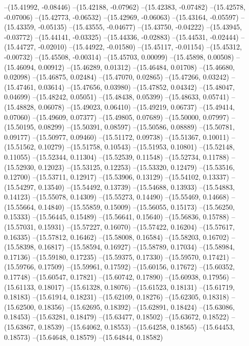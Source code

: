 --(15.41992, -0.08446)
--(15.42188, -0.07962)
--(15.42383, -0.07482)
--(15.42578, -0.07006)
--(15.42773, -0.06532)
--(15.42969, -0.06063)
--(15.43164, -0.05597)
--(15.43359, -0.05135)
--(15.43555, -0.04677)
--(15.43750, -0.04222)
--(15.43945, -0.03772)
--(15.44141, -0.03325)
--(15.44336, -0.02883)
--(15.44531, -0.02444)
--(15.44727, -0.02010)
--(15.44922, -0.01580)
--(15.45117, -0.01154)
--(15.45312, -0.00732)
--(15.45508, -0.00314)
--(15.45703, 0.00099)
--(15.45898, 0.00508)
--(15.46094, 0.00912)
--(15.46289, 0.01312)
--(15.46484, 0.01708)
--(15.46680, 0.02098)
--(15.46875, 0.02484)
--(15.47070, 0.02865)
--(15.47266, 0.03242)
--(15.47461, 0.03614)
--(15.47656, 0.03980)
--(15.47852, 0.04342)
--(15.48047, 0.04699)
--(15.48242, 0.05051)
--(15.48438, 0.05399)
--(15.48633, 0.05741)
--(15.48828, 0.06078)
--(15.49023, 0.06410)
--(15.49219, 0.06737)
--(15.49414, 0.07060)
--(15.49609, 0.07377)
--(15.49805, 0.07689)
--(15.50000, 0.07997)
--(15.50195, 0.08299)
--(15.50391, 0.08597)
--(15.50586, 0.08889)
--(15.50781, 0.09177)
--(15.50977, 0.09460)
--(15.51172, 0.09738)
--(15.51367, 0.10011)
--(15.51562, 0.10279)
--(15.51758, 0.10543)
--(15.51953, 0.10801)
--(15.52148, 0.11055)
--(15.52344, 0.11304)
--(15.52539, 0.11548)
--(15.52734, 0.11788)
--(15.52930, 0.12023)
--(15.53125, 0.12253)
--(15.53320, 0.12479)
--(15.53516, 0.12700)
--(15.53711, 0.12917)
--(15.53906, 0.13129)
--(15.54102, 0.13337)
--(15.54297, 0.13540)
--(15.54492, 0.13739)
--(15.54688, 0.13933)
--(15.54883, 0.14123)
--(15.55078, 0.14309)
--(15.55273, 0.14490)
--(15.55469, 0.14668)
--(15.55664, 0.14840)
--(15.55859, 0.15009)
--(15.56055, 0.15173)
--(15.56250, 0.15333)
--(15.56445, 0.15489)
--(15.56641, 0.15640)
--(15.56836, 0.15788)
--(15.57031, 0.15931)
--(15.57227, 0.16070)
--(15.57422, 0.16204)
--(15.57617, 0.16335)
--(15.57812, 0.16462)
--(15.58008, 0.16584)
--(15.58203, 0.16702)
--(15.58398, 0.16817)
--(15.58594, 0.16927)
--(15.58789, 0.17034)
--(15.58984, 0.17136)
--(15.59180, 0.17235)
--(15.59375, 0.17330)
--(15.59570, 0.17421)
--(15.59766, 0.17509)
--(15.59961, 0.17592)
--(15.60156, 0.17672)
--(15.60352, 0.17748)
--(15.60547, 0.17821)
--(15.60742, 0.17890)
--(15.60938, 0.17956)
--(15.61133, 0.18017)
--(15.61328, 0.18076)
--(15.61523, 0.18131)
--(15.61719, 0.18183)
--(15.61914, 0.18231)
--(15.62109, 0.18276)
--(15.62305, 0.18318)
--(15.62500, 0.18356)
--(15.62695, 0.18392)
--(15.62891, 0.18424)
--(15.63086, 0.18453)
--(15.63281, 0.18479)
--(15.63477, 0.18502)
--(15.63672, 0.18522)
--(15.63867, 0.18539)
--(15.64062, 0.18553)
--(15.64258, 0.18565)
--(15.64453, 0.18573)
--(15.64648, 0.18579)
--(15.64844, 0.18582)
